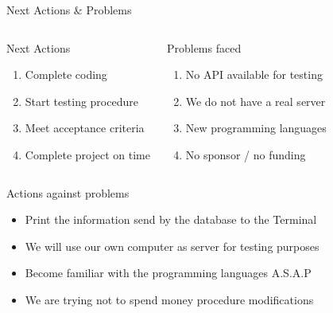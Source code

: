 \documentclass[xcolor=pdftex,dvipsnames,table]{beamer}
\begin{document}
\begin{frame}{Next Actions \& Problems}
    \begin{columns}
        \begin{block}{Next Actions}
          \begin{enumerate}
            \item Complete coding \\ \pause
            \item Start testing procedure \\ \pause
            \item Meet acceptance criteria \\ \pause
            \item Complete project on time \\ \pause
          \end{enumerate} 
        \end{block}
        \begin{block}{Problems faced}
          \begin{enumerate}
            \item No \alert{API} available for testing \\ \pause
            \item We do not have a real server \\ \pause
            \item New programming languages \\ \pause
            \item No sponsor / no funding  \\ \pause
          \end{enumerate}         
        \end{block}
    \end{columns}
    \begin{block}{Actions against problems}
      \begin{itemize}
        \item Print the information send by the database to the Terminal \\ \pause
        \item We will use our own computer as server for testing purposes \\ \pause
        \item Become familiar with the programming languages A.S.A.P \\ \pause
        \item We are trying not to spend money procedure modifications
      \end{itemize}
    \end{block}
\end{frame}
\end{document}
